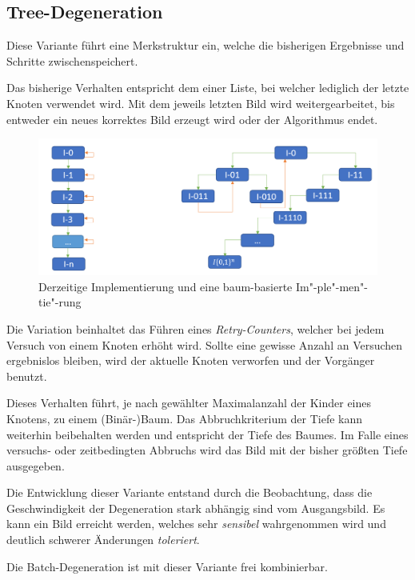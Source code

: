 \subsection{Tree-Degeneration}
Diese Variante führt eine Merkstruktur ein, welche die bisherigen Ergebnisse und Schritte zwischenspeichert. 

Das bisherige Verhalten entspricht dem einer Liste, bei welcher lediglich der letzte Knoten verwendet wird. Mit dem jeweils letzten Bild wird weitergearbeitet, bis entweder ein neues korrektes Bild erzeugt wird oder der Algorithmus endet. 
\begin{figure}[h]
	\centering
	\includegraphics[width=0.8\linewidth]{Images/DegenTreeNormal}
	\caption[Tree-Degeneration]{Derzeitige Implementierung und eine baum-basierte Im"-ple"-men"-tie"-rung}
	\label{fig:degentreenormal}
\end{figure}

Die Variation beinhaltet das Führen eines \textit{Retry-Counters}, welcher bei jedem Versuch von einem Knoten erhöht wird. Sollte eine gewisse Anzahl an Versuchen ergebnislos bleiben, wird der aktuelle Knoten verworfen und der Vorgänger benutzt. 

Dieses Verhalten führt, je nach gewählter Maximalanzahl der Kinder eines Knotens, zu einem (Binär-)Baum. Das Abbruchkriterium der Tiefe kann weiterhin beibehalten werden und entspricht der Tiefe des Baumes. Im Falle eines versuchs- oder zeitbedingten Abbruchs wird das Bild mit der bisher größten Tiefe ausgegeben.

Die Entwicklung dieser Variante entstand durch die Beobachtung, dass die Geschwindigkeit der Degeneration stark abhängig sind vom Ausgangsbild. Es kann ein Bild erreicht werden, welches sehr \textit{sensibel} wahrgenommen wird und deutlich schwerer Änderungen \textit{toleriert}.

Die Batch-Degeneration ist mit dieser Variante frei kombinierbar.  